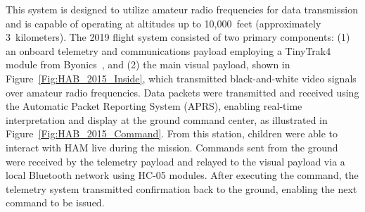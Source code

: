 This system is designed to utilize amateur radio frequencies for data transmission and is capable of operating at altitudes up to 10{,}000~feet (approximately 3~kilometers). The 2019 flight system consisted of two primary components: (1) an onboard telemetry and communications payload employing a TinyTrak4 module from Byonics~\cite{byonics_tinytrak4}, and (2) the main visual payload, shown in Figure~\ref{Fig:HAB_2015_Inside}, which transmitted black-and-white video signals over amateur radio frequencies. Data packets were transmitted and received using the Automatic Packet Reporting System (APRS), enabling real-time interpretation and display at the ground command center, as illustrated in Figure~\ref{Fig:HAB_2015_Command}. From this station, children were able to interact with HAM live during the mission. Commands sent from the ground were received by the telemetry payload and relayed to the visual payload via a local Bluetooth network using HC-05 modules. After executing the command, the telemetry system transmitted confirmation back to the ground, enabling the next command to be issued.

